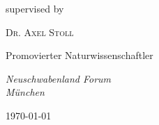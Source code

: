 \begin{titlepage}
	\vspace{10\baselineskip} %
	
	supervised by

	\vspace{0.3\baselineskip} %

	{\scshape\Large Dr. Axel Stoll \\}

	\vspace{0.5\baselineskip}

	Promovierter Naturwissenschaftler

	\vspace{0.5\baselineskip}

	\textit{Neuschwabenland Forum \\ München}	

	\vfill %
	
	
	
	\vspace{0.3\baselineskip} %
	
	\today%
	

\end{titlepage}
